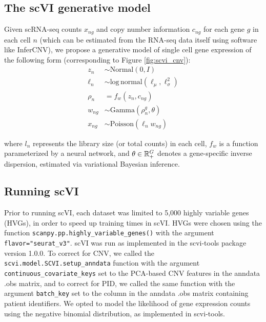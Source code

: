 \documentclass{article}
\begin{document}
\subsection{The scVI generative model}
Given scRNA-seq counts $x_{ng}$ and copy number information $c_{ng}$ for each gene $g$ in each cell $n$ (which can be estimated from the RNA-seq data itself using software like InferCNV), we propose a generative model of single cell gene expression of the following form (corresponding to Figure \ref{fig:scvi_cnv}):\\

\begin{align}%
{z_n} & {\sim {\mathrm{Normal}}\left( {0,I} \right)} \\ 
{\ell _n} & {\sim {\mathrm{log}}\,{\mathrm{normal}}\left( {\ell _\mu ,\ell _\sigma ^2} \right)} \\ 
{\rho _n} & { = f_w\left( {z_n,c_{ng}} \right)} \\ 
{w_{ng}} & {\sim {\mathrm{Gamma}}\left( {\rho _n^g,\theta } \right)} \\ 
{x_{ng}} & {\sim {\mathrm{Poisson}}\left( {\ell _nw_{ng}} \right)}
\end{align}

where $l_n$ represents the library size (or total counts) in each cell, $f_w$ is a function parameterized by a neural network, and $\theta \in {\Bbb R}_ + ^G$ denotes a gene-specific inverse dispersion, estimated via variational Bayesian inference.

\subsection{Running scVI}
Prior to running scVI, each dataset was limited to 5,000 highly variable genes (HVGs), in order to speed up training times in scVI. HVGs were chosen using the function \texttt{scanpy.pp.highly\_variable\_genes()} with the argument \texttt{flavor="seurat\_v3"}. scVI was run as implemented in the scvi-tools package version 1.0.0. To correct for CNV, we called the \texttt{scvi.model.SCVI.setup\_anndata} function with the argument \texttt{continuous\_covariate\_keys} set to the PCA-based CNV features in the anndata .obs matrix, and to correct for PID, we called the same function with the argument \texttt{batch\_key} set to the column in the anndata .obs matrix containing patient identifiers. We opted to model the likelihood of gene expression counts using the negative binomial distribution, as implemented in scvi-tools.
\end{document}
